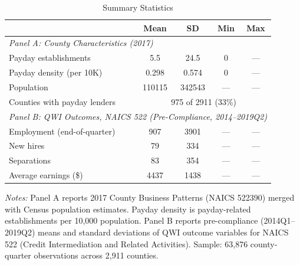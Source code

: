 \begin{table}[htbp]
\centering
\caption{Summary Statistics}
\label{tab:summary}
\begin{tabular}{lcccc}
\toprule
 & Mean & SD & Min & Max \\
\midrule
\multicolumn{5}{l}{\textit{Panel A: County Characteristics (2017)}} \\
Payday establishments & 5.5 & 24.5 & 0 & --- \\
Payday density (per 10K) & 0.298 & 0.574 & 0 & --- \\
Population & 110115 & 342543 & --- & --- \\
Counties with payday lenders & \multicolumn{4}{c}{975 of 2911 (33\%)} \\
\midrule
\multicolumn{5}{l}{\textit{Panel B: QWI Outcomes, NAICS 522 (Pre-Compliance, 2014--2019Q2)}} \\
Employment (end-of-quarter) & 907 & 3901 & --- & --- \\
New hires & 79 & 334 & --- & --- \\
Separations & 83 & 354 & --- & --- \\
Average earnings (\$) & 4437 & 1438 & --- & --- \\
\bottomrule
\end{tabular}
\begin{tablenotes}[flushleft]\small
\item \textit{Notes:} Panel A reports 2017 County Business Patterns (NAICS 522390) merged with Census population estimates. Payday density is payday-related establishments per 10,000 population. Panel B reports pre-compliance (2014Q1--2019Q2) means and standard deviations of QWI outcome variables for NAICS 522 (Credit Intermediation and Related Activities). Sample: 63,876 county-quarter observations across 2,911 counties.
\end{tablenotes}
\end{table}

